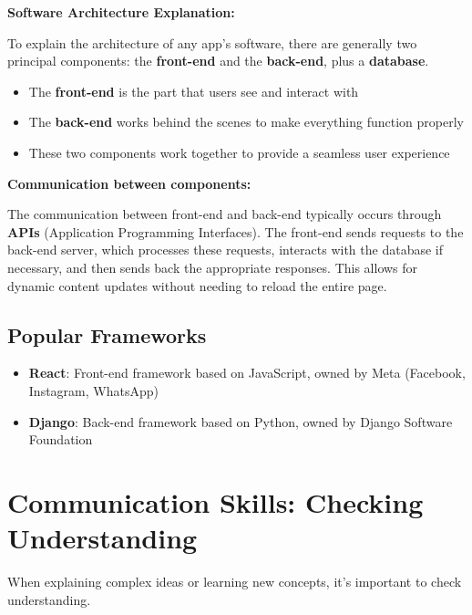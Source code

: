 \begin{examplebox}[title=Explaining Technical Concepts]
\textbf{Software Architecture Explanation:}

To explain the architecture of any app's software, there are generally two principal components: the \textbf{front-end} and the \textbf{back-end}, plus a \textbf{database}.

\begin{itemize}
    \item The \textbf{front-end} is the part that users see and interact with
    \item The \textbf{back-end} works behind the scenes to make everything function properly
    \item These two components work together to provide a seamless user experience
\end{itemize}

\textbf{Communication between components:}

The communication between front-end and back-end typically occurs through \textbf{APIs} (Application Programming Interfaces). The front-end sends requests to the back-end server, which processes these requests, interacts with the database if necessary, and then sends back the appropriate responses. This allows for dynamic content updates without needing to reload the entire page.
\end{examplebox}

\subsection{Popular Frameworks}
\begin{itemize}
    \item \textbf{React}: Front-end framework based on JavaScript, owned by Meta (Facebook, Instagram, WhatsApp)
    \item \textbf{Django}: Back-end framework based on Python, owned by Django Software Foundation
\end{itemize}

\section{Communication Skills: Checking Understanding}

When explaining complex ideas or learning new concepts, it's important to check understanding.

